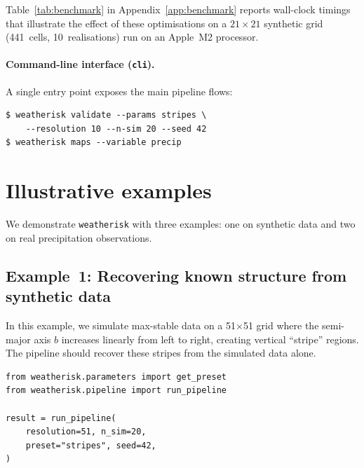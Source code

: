 \documentclass[preprint,12pt,a4paper]{elsarticle}
\begin{document}
Table~\ref{tab:benchmark} in Appendix~\ref{app:benchmark} reports
wall-clock timings that illustrate the effect of these optimisations
on a $21\times 21$ synthetic grid (441~cells, 10~realisations) run
on an Apple~M2 processor.

\paragraph{Command-line interface (\texttt{cli}).}
A single entry point exposes the main pipeline flows:
\begin{lstlisting}[numbers=none]
$ weatherisk validate --params stripes \
    --resolution 10 --n-sim 20 --seed 42
$ weatherisk maps --variable precip
\end{lstlisting}

\section{Illustrative examples}
\label{sec:examples}

We demonstrate \texttt{weatherisk} with three examples: one on
synthetic data and two on real precipitation observations.

\subsection{Example~1: Recovering known structure from
  synthetic data}
\label{sec:ex-synthetic}

In this example, we simulate max-stable data on a 51$\times$51 grid
where the semi-major axis $b$ increases linearly from left to right,
creating vertical ``stripe'' regions.  The pipeline should recover
these stripes from the simulated data alone.

\begin{lstlisting}[caption={Running the stripes validation.},
  label=lst:validate]
from weatherisk.parameters import get_preset
from weatherisk.pipeline import run_pipeline

result = run_pipeline(
    resolution=51, n_sim=20,
    preset="stripes", seed=42,
)
\end{lstlisting}
\end{document}
